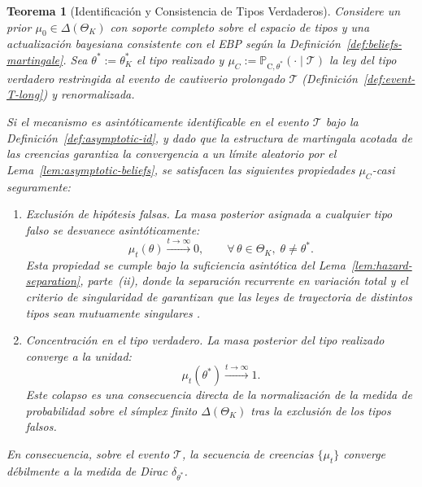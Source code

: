 \documentclass[review,authoryear,12pt]{elsarticle}
\theoremstyle{plain}
\newtheorem{theorem}{Teorema}
\theoremstyle{definition}
\newcommand{\ProbC}[1]{\mathbb{P}_{\mathrm{C},#1}}
\newcommand{\ThetaK}{\Theta_K}
\newcommand{\1}{\mathbf{1}}
\begin{document}
\begin{theorem}[Identificación y Consistencia de Tipos Verdaderos]\label{thm:posterior-consistency}
\normalfont
Considere un prior $\mu_0\in\Delta(\ThetaK)$ con soporte completo sobre el espacio de tipos y una actualización bayesiana consistente con el EBP según la Definición~\ref{def:beliefs-martingale}. Sea $\theta^\ast:=\theta_K^\ast$ el tipo realizado y $\mu_C:=\ProbC{\theta^\ast}(\cdot\mid\mathcal{T})$ la ley del tipo verdadero restringida al evento de cautiverio prolongado $\mathcal{T}$ \textup{(}Definición~\ref{def:event-T-long}\textup{)} y renormalizada.

Si el mecanismo es asintóticamente identificable en el evento $\mathcal{T}$ bajo la Definición~\ref{def:asymptotic-id}, y dado que la estructura de martingala acotada de las creencias garantiza la convergencia a un límite aleatorio por el Lema~\ref{lem:asymptotic-beliefs}, se satisfacen las siguientes propiedades $\mu_C$-casi seguramente:
\begin{enumerate}
  \item Exclusión de hipótesis falsas. La masa posterior asignada a cualquier tipo falso se desvanece asintóticamente:
  \begin{equation*}
  \mu_t(\theta)\xrightarrow{t\to\infty}0,\qquad \forall\,\theta\in\ThetaK,\;\theta\neq\theta^\ast.
  \end{equation*}
  Esta propiedad se cumple bajo la suficiencia asintótica del Lema~\ref{lem:hazard-separation}, parte~\textup{(ii)}, donde la separación recurrente en variación total y el criterio de singularidad de \citet{Kakutani1948} garantizan que las leyes de trayectoria de distintos tipos sean mutuamente singulares \citet{Shiryaev2019Probability}.

  \item Concentración en el tipo verdadero. La masa posterior del tipo realizado converge a la unidad:
  \begin{equation*}
  \mu_t(\theta^\ast)\xrightarrow{t\to\infty}1.
  \end{equation*}
  Este colapso es una consecuencia directa de la normalización de la medida de probabilidad sobre el símplex finito $\Delta(\ThetaK)$ tras la exclusión de los tipos falsos.
\end{enumerate}
En consecuencia, sobre el evento $\mathcal{T}$, la secuencia de creencias $\{\mu_t\}$ converge débilmente a la medida de Dirac $\delta_{\theta^\ast}$.
\end{theorem}
\end{document}
